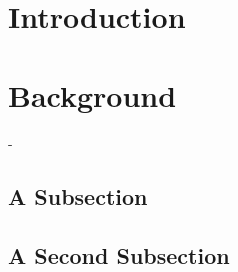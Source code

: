 \documentclass{workreport}
\begin{document}
\begin{body}

\section{Introduction}

	\lipsum[1-6]

\section{Background}

	\lipsum[1-2]-

\subsection{A Subsection}

	\lipsum[1]

\subsection{A Second Subsection}

	\lipsum[2]


\end{body}
\end{document}
